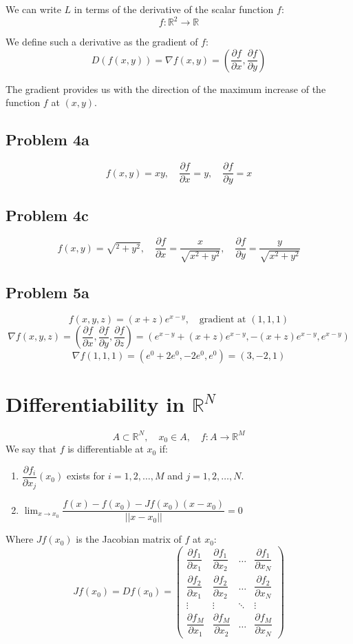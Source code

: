 \documentclass[11pt]{article}
\begin{document}
We can write $L$ in terms of the derivative of the scalar function $f$:
\[
f : \mathbb{R}^2 \rightarrow \mathbb{R} 
\]

We define such a derivative as the gradient of $f$:
\[
D(f(x,y)) = \nabla f(x,y) = \left(\frac{\partial f}{\partial x}, \frac{\partial f}{\partial y}\right)
\]

The gradient provides us with the direction of the maximum increase of the function $f$ at $(x,y)$.

\subsection*{Problem 4a}
\[
f(x,y) = xy, \quad \frac{\partial f}{\partial x} = y, \quad \frac{\partial f}{\partial y} = x
\]

\subsection*{Problem 4c}
\[
f(x,y) = \sqrt{^2 + y^2}, \quad \frac{\partial f}{\partial x} = \frac{x}{\sqrt{x^2 + y^2}}, \quad \frac{\partial f}{\partial y} = \frac{y}{\sqrt{x^2 + y^2}}
\]

\subsection*{Problem 5a}
\[
f(x,y,z) = (x + z) e^{x - y}, \quad \text{gradient at } (1,1,1)
\]
\[
\nabla f(x,y,z) = \left(\frac{\partial f}{\partial x}, \frac{\partial f}{\partial y}, \frac{\partial f}{\partial z}\right) = \left(e^{x - y} + (x + z)e^{x - y}, -(x + z)e^{x - y}, e^{x - y}\right)
\]
\[
\nabla f(1,1,1) = (e^0 + 2e^0, -2e^0, e^0) = (3, -2, 1)
\]

\section{Differentiability in $\mathbb{R}^N$}
\[
A \subset \mathbb{R}^N, \quad x_0 \in A, \quad f : A \rightarrow \mathbb{R}^M
\] 
We say that $f$ is differentiable at $x_0$ if:
\begin{enumerate}
    \item $\dfrac{\partial f_i}{\partial x_j}(x_0)$ exists for $i = 1, 2, \ldots, M$ and $j = 1, 2, \ldots, N$.
    \item $\lim_{x \to x_0} \dfrac{f(x) - f(x_0) - Jf(x_0)(x - x_0)}{||x - x_0||} = 0$
\end{enumerate}
    
Where $Jf(x_0)$ is the Jacobian matrix of $f$ at $x_0$:
\[
Jf(x_0) = Df(x_0) =
\begin{pmatrix}
    \dfrac{\partial f_1}{\partial x_1} & \dfrac{\partial f_1}{\partial x_2} & \ldots & \dfrac{\partial f_1}{\partial x_N} \\
    \dfrac{\partial f_2}{\partial x_1} & \dfrac{\partial f_2}{\partial x_2} & \ldots & \dfrac{\partial f_2}{\partial x_N} \\
    \vdots & \vdots & \ddots & \vdots \\
    \dfrac{\partial f_M}{\partial x_1} & \dfrac{\partial f_M}{\partial x_2} & \ldots & \dfrac{\partial f_M}{\partial x_N}
\end{pmatrix}
\]
\end{document}

